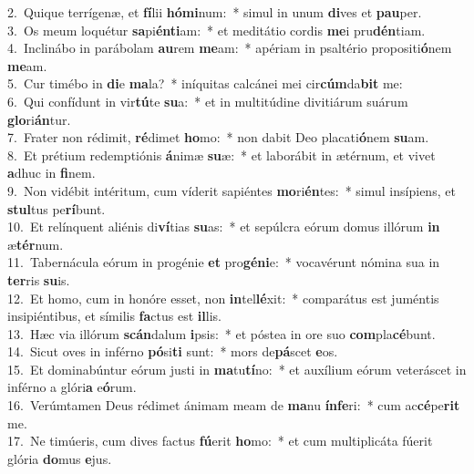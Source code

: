 {2.~}Quique terrígenæ, et \textbf{fí}lii \textbf{hó}\textbf{mi}num:~* simul in unum \textbf{di}ves et \textbf{pau}per.\\
{3.~}Os meum loquétur \textbf{sa}pi\textbf{én}\textbf{ti}am:~* et meditátio cordis \textbf{me}i pru\textbf{dén}tiam.\\
{4.~}Inclinábo in parábolam \textbf{au}rem \textbf{me}am:~* apériam in psaltério propositi\textbf{ó}nem \textbf{me}am.\\
{5.~}Cur timébo in \textbf{di}e \textbf{ma}la?~* iníquitas calcánei mei cir\textbf{cúm}da\textbf{bit} me:\\
{6.~}Qui confídunt in vir\textbf{tú}te \textbf{su}a:~* et in multitúdine divitiárum suárum \textbf{glo}ri\textbf{án}tur.\\
{7.~}Frater non rédimit, \textbf{ré}dimet \textbf{ho}mo:~* non dabit Deo placati\textbf{ó}nem \textbf{su}am.\\
{8.~}Et prétium redemptiónis \textbf{á}nimæ \textbf{su}æ:~* et laborábit in ætérnum, et vivet \textbf{a}dhuc in \textbf{fi}nem.\\
{9.~}Non vidébit intéritum, cum víderit sapiéntes \textbf{mo}ri\textbf{én}tes:~* simul insípiens, et \textbf{stul}tus pe\textbf{rí}bunt.\\
{10.~}Et relínquent aliénis di\textbf{ví}tias \textbf{su}as:~* et sepúlcra eórum domus illórum \textbf{in} æ\textbf{tér}num.\\
{11.~}Tabernácula eórum in progénie \textbf{et} pro\textbf{gé}\textbf{ni}e:~* vocavérunt nómina sua in \textbf{ter}ris \textbf{su}is.\\
{12.~}Et homo, cum in honóre esset, non \textbf{in}tel\textbf{lé}xit:~* comparátus est juméntis insipiéntibus, et símilis \textbf{fa}ctus est \textbf{il}lis.\\
{13.~}Hæc via illórum \textbf{scán}dalum \textbf{i}psis:~* et póstea in ore suo \textbf{com}pla\textbf{cé}bunt.\\
{14.~}Sicut oves in inférno \textbf{pó}si\textbf{ti} sunt:~* mors de\textbf{pá}scet \textbf{e}os.\\
{15.~}Et dominabúntur eórum justi in \textbf{ma}tu\textbf{tí}no:~* et auxílium eórum veteráscet in inférno a glóri\textbf{a} e\textbf{ó}rum.\\
{16.~}Verúmtamen Deus rédimet ánimam meam de \textbf{ma}nu \textbf{ín}\textbf{fe}ri:~* cum ac\textbf{cé}pe\textbf{rit} me.\\
{17.~}Ne timúeris, cum dives factus \textbf{fú}erit \textbf{ho}mo:~* et cum multiplicáta fúerit glória \textbf{do}mus \textbf{e}jus.\\
